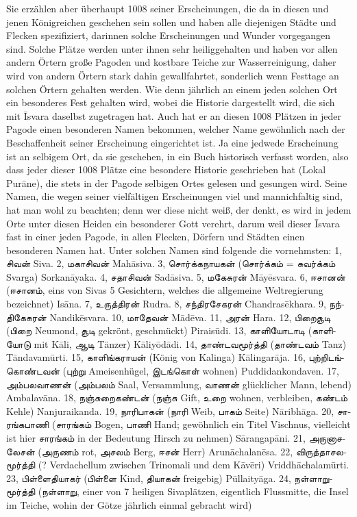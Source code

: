 \documentclass{article}
\newcommand{\TamilText}[1]{\texttamil{#1}}
\newcommand{\tam}[1]{\TamilText{#1}}
\begin{document}
Sie erzählen aber überhaupt 1008 seiner Erscheinungen, die da in diesen und jenen Königreichen geschehen sein sollen und haben alle diejenigen Städte und Flecken spezifiziert, darinnen solche Erscheinungen und Wunder vorgegangen sind. Solche Plätze werden unter ihnen sehr heiliggehalten und haben vor allen andern Örtern große Pagoden und kostbare Teiche zur Wasserreinigung, daher wird von andern Örtern stark dahin gewallfahrtet, sonderlich wenn Festtage an solchen Örtern gehalten werden. Wie denn jährlich an einem jeden solchen Ort ein besonderes Fest gehalten wird, wobei die Historie dargestellt wird, die sich mit \={I}svara daselbst zugetragen hat. Auch hat er an diesen 1008 Plätzen in jeder Pagode einen besonderen Namen bekommen, welcher Name gewöhnlich nach der Beschaffenheit seiner Erscheinung eingerichtet ist. Ja eine jedwede Erscheinung ist an selbigem Ort, da sie geschehen, in ein Buch historisch verfasst worden, also dass jeder dieser 1008 Plätze eine besondere Historie geschrieben hat (Lokal Pur\={a}ne), die stets in der Pagode selbigen Ortes gelesen und gesungen wird. Seine Namen, die wegen seiner vielfältigen Erscheinungen viel und mannichfaltig sind, hat man wohl zu beachten; denn wer diese nicht weiß, der denkt, es wird in jedem Orte unter diesen Heiden ein besonderer Gott verehrt, darum weil dieser \={I}svara fast in einer jeden Pagode, in allen Flecken, Dörfern und Städten einen besonderen Namen hat. Unter solchen Namen sind folgende die vornehmsten: 1, \tam{சிவன்} Siva. 2, \tam{மகாசிவன்} Mah\={a}siva. 3, \tam{சொர்க்கநாயகன்} (\tam{சொர்க்கம்} = \tam{சுவர்க்கம்} Svarga) Sorkan\={a}yaka. 4, \tam{சதாசிவன்} Sad\={a}siva. 5, \tam{மகேசுரன்} M\={a}y\={e}svara. 6, \tam{ஈசானன்} (\tam{ஈசானம்}, eins von Sivas 5 Gesichtern, welches die allgemeine Weltregierung bezeichnet) Is\={a}na. 7, \tam{உருத்திரன்} Rudra. 8, \tam{சந்திரசேகரன்} Chandras\={e}khara. 9, \tam{நந்திகேசுரன்} Nandik\={e}svara. 10, \tam{மாதேவன்} M\={a}d\={e}va. 11, \tam{அரன்} Hara. 12, \tam{பிறைசூடி} (\tam{பிறை} Neumond, \tam{சூடி} gekrönt, geschmückt) Pirais\={u}di. 13, \tam{காளியோடாடி} (\tam{காளியோடு} mit K\={a}li, \tam{ஆடி} Tänzer) K\={a}liy\={o}d\={a}di. 14, \tam{தாண்டவமூர்த்தி} (\tam{தாண்டவம்} Tanz) T\={a}ndavam\={u}rti. 15, \tam{காளிங்கராயன்} (König von Kalinga) K\={a}lingar\={a}ja. 16, \tam{புற்றிடங்கொண்டவன்} (\tam{புற்று} Ameisenhügel, \tam{இடங்கொள்} wohnen) Puddidankondaven. 17, \tam{அம்பலவாணன்} (\tam{அம்பலம்} Saal, Versammlung, \tam{வாணன்} glücklicher Mann, lebend) Ambalav\={a}na. 18, \tam{நஞ்சுறைகண்டன்} (\tam{நஞ்சு} Gift, \tam{உறை} wohnen, verbleiben, \tam{கண்டம்} Kehle) Nanjuraikanda. 19, \tam{நாரிபாகன்} (\tam{நாரி} Weib, \tam{பாகம்} Seite) N\={a}ribh\={a}ga. 20, \tam{சாரங்கபாணி} (\tam{சாரங்கம்} Bogen, \tam{பாணி} Hand; gewöhnlich ein Titel Vischnus, vielleicht ist hier \tam{சாரங்கம்} in der Bedeutung Hirsch zu nehmen) S\={a}rangap\={a}ni. 21, \tam{அருனாசலேசன்} (\tam{அருணம்} rot, \tam{அசலம்} Berg, \tam{ஈசன்} Herr) Arun\={a}chalan\={e}sa. 22, \tam{விருத்தாசலமூர்த்தி} (? Verdachellum zwischen Trinomali und dem K\={a}v\={e}ri) Vriddh\={a}chalam\={u}rti. 23, \tam{பிள்ளைதியாகர்} (\tam{பிள்ளை} Kind, \tam{தியாகன்} freigebig) Püllaity\={a}ga. 24, \tam{நள்ளாறுமூர்த்தி} (\tam{நள்ளாறு}, einer von 7 heiligen Sivaplätzen, eigentlich Flussmitte, die Insel im Teiche, wohin der Götze jährlich einmal gebracht wird) 
\end{document}
